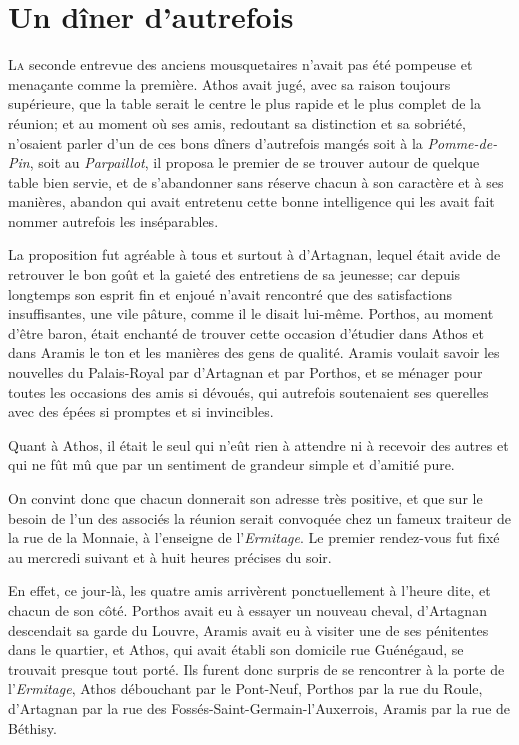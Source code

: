 \chapter{Un dîner d'autrefois}

\lettrine{L}{a} seconde entrevue des anciens mousquetaires n'avait pas été pompeuse et menaçante comme la première. Athos avait jugé, avec sa raison toujours supérieure, que la table serait le centre le plus rapide et le plus complet de la réunion; et au moment où ses amis, redoutant sa distinction et sa sobriété, n'osaient parler d'un de ces bons dîners d'autrefois mangés soit à la \textit{Pomme-de-Pin}, soit au \textit{Parpaillot}, il proposa le premier de se trouver autour de quelque table bien servie, et de s'abandonner sans réserve chacun à son caractère et à ses manières, abandon qui avait entretenu cette bonne intelligence qui les avait fait nommer autrefois les inséparables.

La proposition fut agréable à tous et surtout à d'Artagnan, lequel était avide de retrouver le bon goût et la gaieté des entretiens de sa jeunesse; car depuis longtemps son esprit fin et enjoué n'avait rencontré que des satisfactions insuffisantes, une vile pâture, comme il le disait lui-même. Porthos, au moment d'être baron, était enchanté de trouver cette occasion d'étudier dans Athos et dans Aramis le ton et les manières des gens de qualité. Aramis voulait savoir les nouvelles du Palais-Royal par d'Artagnan et par Porthos, et se ménager pour toutes les occasions des amis si dévoués, qui autrefois soutenaient ses querelles avec des épées si promptes et si invincibles.

Quant à Athos, il était le seul qui n'eût rien à attendre ni à recevoir des autres et qui ne fût mû que par un sentiment de grandeur simple et d'amitié pure.

On convint donc que chacun donnerait son adresse très positive, et que sur le besoin de l'un des associés la réunion serait convoquée chez un fameux traiteur de la rue de la Monnaie, à l'enseigne de l'\textit{Ermitage}. Le premier rendez-vous fut fixé au mercredi suivant et à huit heures précises du soir.

En effet, ce jour-là, les quatre amis arrivèrent ponctuellement à l'heure dite, et chacun de son côté. Porthos avait eu à essayer un nouveau cheval, d'Artagnan descendait sa garde du Louvre, Aramis avait eu à visiter une de ses pénitentes dans le quartier, et Athos, qui avait établi son domicile rue Guénégaud, se trouvait presque tout porté. Ils furent donc surpris de se rencontrer à la porte de l'\textit{Ermitage}, Athos débouchant par le Pont-Neuf, Porthos par la rue du Roule, d'Artagnan par la rue des Fossés-Saint-Germain-l'Auxerrois, Aramis par la rue de Béthisy.

